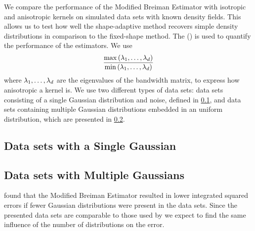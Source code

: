 We compare the performance of the Modified Breiman Estimator with isotropic and anisotropic kernels on simulated data sets with known density fields. This allows us to test how well the shape-adaptive method recovers simple density distributions in comparison to the fixed-shape method. 
The \mse (\MSE) is used to quantify the performance of the estimators. We use
\begin{equation*}\label{eq:experiment:anisotropicmetric}
	\frac{\max\left(\lambda_1, \dotsc, \lambda_d \right)}{\min\left(\lambda_1, \dotsc, \lambda_d \right)}
\end{equation*}
where $\lambda_1, \dotsc, \lambda_d$ are the eigenvalues of the bandwidth matrix, to express how anisotropic a kernel is.
We use two different types of data sets: data sets consisting of a single Gaussian distribution and noise, defined in \cref{s:experiment:singlesphere},  and data sets containing multiple Gaussian distributions embedded in an uniform distribution, which are presented in \cref{s:experiment:multisphere}.

\subsection{Data sets with a Single Gaussian}
\label{s:experiment:singlesphere}


\subsection{Data sets with Multiple Gaussians}
\label{s:experiment:multisphere}


\textcite{ferdosi2011comparison} found that the Modified Breiman Estimator resulted in lower integrated squared errors if fewer Gaussian distributions were present in the data sets. Since the presented data sets are comparable to those used by \citeauthor{ferdosi2011comparison} we expect to find the same influence of the number of distributions on the error.
